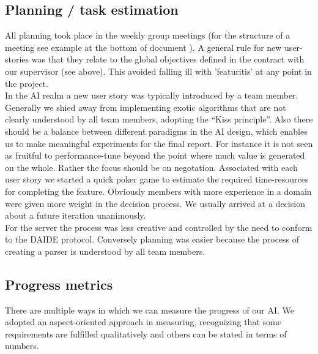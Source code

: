 \documentclass[11pt]{article}
\begin{document}
\subsection{Planning / task estimation}
All planning took place in the weekly group meetings (for the structure
of a meeting see example at the bottom of document ). A general rule for
new user-stories was that they relate to the global objectives defined
in the contract with our supervisor (see above). This avoided falling ill
with 'featuritis' at any point in the project. 
\\
In the AI realm a new user story was typically introduced
by a team member. Generally we shied away from implementing exotic
algorithms that are not clearly understood by all team members, adopting
the ``Kiss principle''. Also there should be a balance between different
paradigms in the AI design, which enables us to make meaningful 
experiments for the final report. For instance it is not seen as fruitful
to performance-tune beyond the point where much value is generated on the
whole. Rather the focus should be on negotation. Associated with each
user story we started a quick poker game to estimate the required
time-resources for completing the feature. Obviously members with more
experience in a domain were given more weight in the decision process.
We usually arrived at a decision about a future iteration unanimously.
\\ 
For the server the process was less creative and controlled by the
need to conform to the DAIDE protocol. Conversely planning was 
easier because the process of creating a parser is understood by 
all team members.

\subsection{Progress metrics}
There are multiple ways in which we can measure the progress of our AI. 
We adopted an aspect-oriented approach in measuring, recognizing that 
some requirements are fulfilled qualitatively and others can be stated
in terms of numbers.
\end{document}
